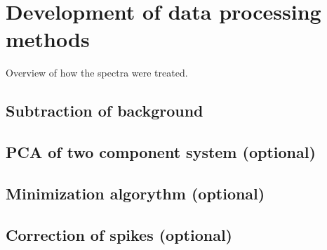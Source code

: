 \section{Development of data processing methods}

Overview of how the spectra were treated.


\subsection{Subtraction of background}
\subsection{PCA of two component system (optional)}
\subsection{Minimization algorythm (optional)}
\subsection{Correction of spikes (optional)}




